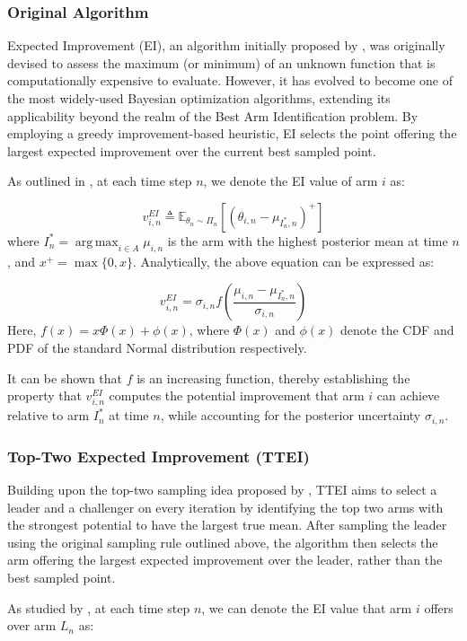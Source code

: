 \documentclass[a4paper, 12pt]{article}
\DeclareMathOperator{\argmax}{arg\,max}
\theoremstyle{definition}
\begin{document}
\subsubsection{Original Algorithm}
Expected Improvement (EI), an algorithm initially proposed by \cite{expectedimprovement}, was originally devised to assess the maximum (or minimum) of an unknown function that is computationally expensive to evaluate. However, it has evolved to become one of the most widely-used Bayesian optimization algorithms, extending its applicability beyond the realm of the Best Arm Identification problem. By employing a greedy improvement-based heuristic, EI selects the point offering the largest expected improvement over the current best sampled point.

As outlined in \cite{ttei}, at each time step $n$, we denote the EI value of arm $i$ as:

\[
v_{i,n}^{EI} \triangleq \mathbb{E}_{\theta_n\sim \Pi_n} [(\theta_{i,n}-\mu_{I_n^*,n})^+]
\]
where $I_n^* = \argmax_{i\in A}\mu_{i,n}$ is the arm with the highest posterior mean at time $n$, and $x^+ = \max\{0,x\}$. Analytically, the above equation can be expressed as:

\[
v_{i,n}^{EI} = \sigma_{i,n} f\left(\frac{\mu_{i,n}-\mu_{I_n^*,n}}{\sigma_{i,n}}\right)
\]
Here, $f(x) = x \Phi(x) + \phi(x)$, where $\Phi(x)$ and $\phi(x)$ denote the CDF and PDF of the standard Normal distribution respectively. 

It can be shown that $f$ is an increasing function, thereby establishing the property that $v_{i,n}^{EI}$ computes the potential improvement that arm $i$ can achieve relative to arm $I_n^*$ at time $n$, while accounting for the posterior uncertainty $\sigma_{i,n}$.

\subsubsection{Top-Two Expected Improvement (TTEI)}
Building upon the top-two sampling idea proposed by \cite{toptwo}, TTEI aims to select a leader and a challenger on every iteration by identifying the top two arms with the strongest potential to have the largest true mean. After sampling the leader using the original sampling rule outlined above, the algorithm then selects the arm offering the largest expected improvement over the leader, rather than the best sampled point.

As studied by \cite{ttei}, at each time step $n$, we can denote the EI value that arm $i$ offers over arm $L_n$ as:
\end{document}
